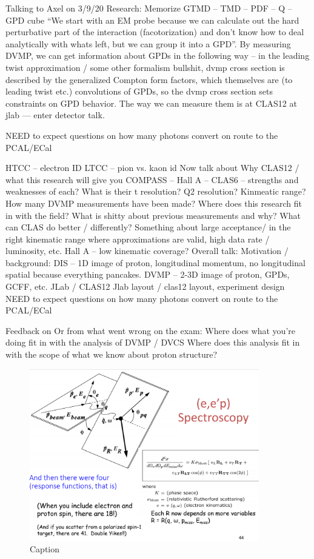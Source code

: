 Talking to Axel on 3/9/20
Research:
Memorize GTMD – TMD – PDF – Q – GPD cube
“We start with an EM probe because we can calculate out the hard perturbative part of the interaction (facotorization) and don’t know how to deal analytically with whats left, but we can group it into a GPD”. 
By measuring DVMP, we can get information about GPDs in the following way – in the leading twist approximation / some other formalism bullshit, dvmp cross section is described by the generalized Compton form factors, which themselves are (to leading twist etc.) convolutions of GPDs, so the dvmp cross section sets constraints on GPD behavior.
The way we can measure them is at CLAS12 at jlab --- enter detector talk.

NEED to expect questions on how many photons convert on route to the PCAL/ECal


HTCC – electron ID
LTCC – pion vs. kaon id
Now talk about Why CLAS12 / what this research will give you
COMPASS – Hall A – CLAS6 – strengths and weaknesses of each? What is their t resolution? Q2 resolution? Kinmeatic range?
How many DVMP measurements have been made? Where does this research fit in with the field? 
What is shitty about previous measurements and why? What can CLAS do better / differently? Something about large acceptance/ in the right kinematic range where approximations are valid, high data rate / luminosity, etc.
Hall A – low kinematic coverage?
Overall talk:
Motivation / background:
	DIS – 1D image of proton, longitudinal momentum, no longitudinal spatial because everything pancakes.
	DVMP – 2-3D image of proton, GPDs, GCFF, etc.
JLab / CLAS12
	Jlab layout / clas12 layout, experiment design
		NEED to expect questions on how many photons convert on route to the PCAL/ECal

Feedback on Or from what went wrong on the exam:
Where does what you’re doing fit in with the analysis of DVMP / DVCS
Where does this analysis fit in with the scope of what we know about proton structure?




        \begin{figure}[H]
            \centering
            \includegraphics[width=10cm]{NuclearPhysics/modules/lepton-scattering/pics/response-funcs.PNG}
            \caption{Caption}
        \end{figure}
        
